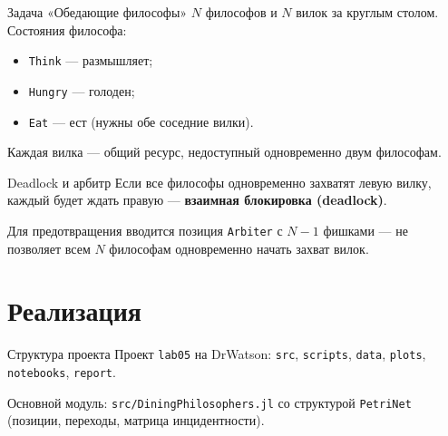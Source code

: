 \documentclass[
  ignorenonframetext,
  aspectratio=169,
  russian,
]{beamer}
\providecommand{\tightlist}{%
  \setlength{\itemsep}{0pt}\setlength{\parskip}{0pt}}
\begin{document}
\begin{frame}[fragile]{Задача «Обедающие философы»}
\protect{}\label{ux437ux430ux434ux430ux447ux430-ux43eux431ux435ux434ux430ux44eux449ux438ux435-ux444ux438ux43bux43eux441ux43eux444ux44b}
\(N\) философов и \(N\) вилок за круглым столом. Состояния философа:

\begin{itemize}[<+->]
\tightlist
\item
  \texttt{Think} --- размышляет;
\item
  \texttt{Hungry} --- голоден;
\item
  \texttt{Eat} --- ест (нужны обе соседние вилки).
\end{itemize}

Каждая вилка --- общий ресурс, недоступный одновременно двум философам.
\end{frame}

\begin{frame}[fragile]{Deadlock и арбитр}
\protect{}\label{deadlock-ux438-ux430ux440ux431ux438ux442ux440}
Если все философы одновременно захватят левую вилку, каждый будет ждать
правую --- \textbf{взаимная блокировка (deadlock)}.

Для предотвращения вводится позиция \texttt{Arbiter} с \(N-1\) фишками
--- не позволяет всем \(N\) философам одновременно начать захват вилок.
\end{frame}

\section{Реализация}\label{ux440ux435ux430ux43bux438ux437ux430ux446ux438ux44f}

\begin{frame}[fragile]{Структура проекта}
\protect{}\label{ux441ux442ux440ux443ux43aux442ux443ux440ux430-ux43fux440ux43eux435ux43aux442ux430}
Проект \texttt{lab05} на DrWatson: \texttt{src}, \texttt{scripts},
\texttt{data}, \texttt{plots}, \texttt{notebooks}, \texttt{report}.

Основной модуль: \texttt{src/DiningPhilosophers.jl} со структурой
\texttt{PetriNet} (позиции, переходы, матрица инцидентности).
\end{frame}
\end{document}

